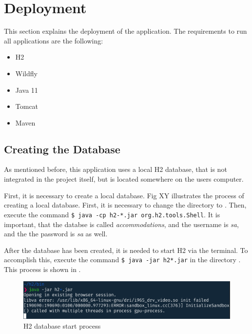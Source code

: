 \section{Deployment}\label{sec:03_depl}
This section explains the deployment of the application.
The requirements to run all applications are the following:
\begin{itemize}
\item H2
\item Wildfly
\item Java 11
\item Tomcat
\item Maven
\end{itemize}


\subsection{Creating the Database}\label{sec:03_depl_createdb}
As mentioned before, this application uses a local H2 database, that is not integrated in the project itself, but is located somewhere on the users computer.

First, it is necessary to create a local database. Fig XY illustrates the process of creating a local database. First, it is necessary to change the directory to . Then, execute the command \texttt{\$ java -cp h2-*.jar org.h2.tools.Shell}. It is important, that the databse is called \textit{accommodations}, and the username is \textit{sa}, and the the password is \textit{sa} as well.

After the database has been created, it is needed to start H2 via the terminal. To accomplish this, execute the command \texttt{\$ java -jar h2*.jar} in the directory . This process is shown in .
\begin{figure}[h]
\centering
\includegraphics[scale=0.2]{images/03_depl/h2_start}
\caption{H2 database start process}
\label{fig:03_depl_createdb_h2start}
\end{figure}

